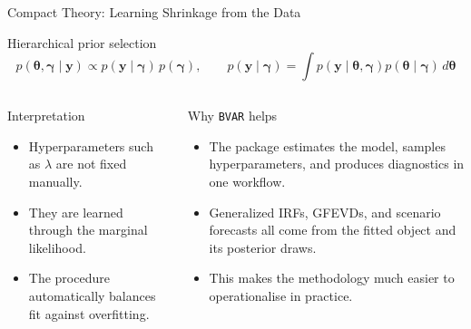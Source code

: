 \documentclass[10pt, aspectratio=169]{beamer}
\begin{document}
\begin{frame}{Compact Theory: Learning Shrinkage from the Data}
\small
\begin{block}{Hierarchical prior selection}
\[
  p(\boldsymbol{\theta},\boldsymbol{\gamma}\mid\boldsymbol{y})
  \propto
  p(\boldsymbol{y}\mid\boldsymbol{\gamma})\,p(\boldsymbol{\gamma}),
  \qquad
  p(\boldsymbol{y}\mid\boldsymbol{\gamma})
  =
  \int
  p(\boldsymbol{y}\mid\boldsymbol{\theta},\boldsymbol{\gamma})
  p(\boldsymbol{\theta}\mid\boldsymbol{\gamma})
  \,d\boldsymbol{\theta}
\]
\end{block}

\begin{columns}[T,onlytextwidth]
  \begin{block}{Interpretation}
  \begin{itemize}
    \item Hyperparameters such as $\lambda$ are not fixed manually.
    \item They are learned through the marginal likelihood.
    \item The procedure automatically balances fit against overfitting.
  \end{itemize}
  \end{block}

  \begin{block}{Why \texttt{BVAR} helps}
  \begin{itemize}
    \item The package estimates the model, samples hyperparameters, and produces diagnostics in one workflow.
    \item Generalized IRFs, GFEVDs, and scenario forecasts all come from the fitted object and its posterior draws.
    \item This makes the methodology much easier to operationalise in practice.
  \end{itemize}
  \end{block}
\end{columns}
\end{frame}
\end{document}
